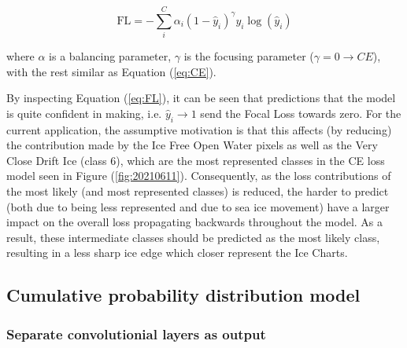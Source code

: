 \begin{equation}
    \label{eq:FL}
    \text{FL} = -\sum_i^C\alpha_i(1 - \hat{y}_i)^\gamma y_i\log{(\hat{y}_i)}
\end{equation}

where $\alpha$ is a balancing parameter, $\gamma$ is the focusing parameter ($\gamma = 0 \rightarrow CE$), with the rest similar as Equation (\ref{eq:CE}).

By inspecting Equation (\ref{eq:FL}), it can be seen that predictions that the model is quite confident in making, i.e. $\hat{y}_i \rightarrow 1$ send the Focal Loss towards zero. For the current application, the assumptive motivation is that this affects (by reducing) the contribution made by the Ice Free Open Water pixels as well as the Very Close Drift Ice (class 6), which are the most represented classes in the CE loss model seen in Figure (\ref{fig:20210611}). Consequently, as the loss contributions of the most likely (and most represented classes) is reduced, the harder to predict (both due to being less represented and due to sea ice movement) have a larger impact on the overall loss propagating backwards throughout the model. As a result, these intermediate classes should be predicted as the most likely class, resulting in a less sharp ice edge which closer represent the Ice Charts. 


\subsection{Cumulative probability distribution model}

\subsubsection{Separate convolutionial layers as output}



